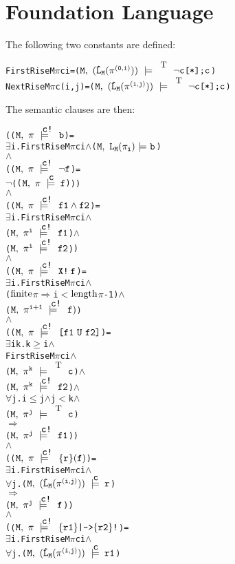 \documentclass{llncs}
\newcommand{\And}{\(\wedge\)}
\newcommand{\Imp}{\(\Rightarrow\)}
\newcommand{\Not}{\(\neg\)}
\newcommand{\Forall}{\(\forall\)}
\newcommand{\Exists}{\(\exists\)}
\newcommand{\IsFinitePath}{\({\rm{finite}}\)}
\newcommand{\PathLength}{\({\rm{length}}\)}
\newcommand{\Leq}{\(\leq\)}
\newcommand{\Geq}{\(\geq\)}
\newcommand{\Le}{\(<\)}
\newcommand{\T}{\texttt{\small\rm{T}}}
\newcommand{\bTrue}{\T}
\renewcommand{\Pi}{\(\pi\)}
\newcommand{\BSem}[3]{(\(\tt#1,~#2~{\models}~#3\))}
\newcommand{\SSem}[4]{(\(\tt{#1,~#2~\models^{\hspace*{-2.3mm}\raisebox{1mm}{\tt#3}}~#4}\))}
\newcommand{\FSem}[4]{(\(\tt{#1,~#2~\models^{\hspace*{-2.3mm}\raisebox{1mm}{\tt#3}}~#4}\))}
\newcommand{\FBool}[1]{#1}
\newcommand{\bNot}[1]{\neg#1}
\newcommand{\fNot}[1]{\neg#1}
\newcommand{\weakClock}[1]{#1}
\newcommand{\strongClock}[1]{#1!}
\newcommand{\restN}[2]{#1^{#2}}
\newcommand{\pathEl}[2]{#1_{#2}}
\newcommand{\pathSeg}[2]{#1^{#2}}
\newcommand{\lHat}[1]{\hat{\texttt{L}}_{#1}}
\newcommand{\lNoHat}[1]{{\texttt{L}}_{#1}}
\newcommand{\sBool}[1]{#1}
\newcommand{\sRepeat}[1]{#1\texttt{[*]}}
\newcommand{\sCat}[2]{#1\texttt{;}#2}
\newcommand{\fAnd}[2]{#1 \wedge #2}
\newcommand{\fNext}[1]{\texttt{X!}\hspace*{0.8mm}#1}
\newcommand{\fUntil}[2]{\texttt{[}#1~\texttt{U}~#2\texttt{]}}
\newcommand{\fSuffixImp}[2]{\{#1\}(#2)}
\newcommand{\fStrongImp}[2]{\{#1\}\texttt{|->}\{#2\}\texttt{!}}
\begin{document}
\section{Foundation Language}

The following two constants are defined:

\begin{alltt}
   FirstRise M {\Pi} c i    = \SSem{M}{(\lHat{M} (\pathSeg{\pi}{(0,i)}))}{\bTrue}{\sCat{\sRepeat{\sBool{\bNot{c}}}}{\sBool{c}}}
   NextRise M {\Pi} c (i,j) = \SSem{M}{(\lHat{M} (\pathSeg{\pi}{(i,j)}))}{\bTrue}{\sCat{\sRepeat{\sBool{\bNot{c}}}}{\sBool{c}}}
\end{alltt}

The semantic clauses are then:

\begin{alltt}
    ({\FSem{M}{{\pi}}{{\strongClock{c}}}{\FBool{b}}} = 
      {\Exists}i. FirstRise M {\Pi} c i {\And} {\BSem{M}{\lNoHat{M}(\pathEl{{\pi}}{i})}{b}}
    {\And}
    ({\FSem{M}{{\pi}}{{\strongClock{c}}}{\fNot{f}}} = 
      {\Not}({\FSem{M}{{\pi}}{{\weakClock{c}}}{f}})) 
    {\And}
    ({\FSem{M}{{\pi}}{{\strongClock{c}}}{\fAnd{f1}{f2}}} = 
      {\Exists}i. FirstRise M {\Pi} c i {\And} 
          {\FSem{M}{\restN{{\pi}}{i}}{{\strongClock{c}}}{f1}}    {\And}
          {\FSem{M}{\restN{{\pi}}{i}}{{\strongClock{c}}}{f2}})
    {\And}
    ({\FSem{M}{{\pi}}{{\strongClock{c}}}{\fNext{f}}} = 
      {\Exists}i. FirstRise M {\Pi} c i            {\And} 
          ({\IsFinitePath} {\Pi} {\Imp} i {\Le} \PathLength {\Pi} - 1) {\And}
          {\FSem{M}{\restN{{\pi}}{i+1}}{{\strongClock{c}}}{f)}}
    {\And}
    ({\FSem{M}{{\pi}}{{\strongClock{c}}}{\fUntil{f1}{f2}}} = 
      {\Exists}i k. k {\Geq} i             {\And}
            FirstRise M {\Pi} c i  {\And}
            {\FSem{M}{\restN{{\pi}}{k}}{\weakClock{\T}}{{\FBool{c}}}}      {\And}  
            {\FSem{M}{\restN{{\pi}}{k}}{{\strongClock{c}}}{f2}}     {\And}
            {\Forall}j. i {\Leq} j {\And} j {\Le} k {\And} 
              {\FSem{M}{\restN{{\pi}}{j}}{\weakClock{\T}}{{\FBool{c}}}} 
              {\Imp}
              {\FSem{M}{\restN{{\pi}}{j}}{{\strongClock{c}}}{f1}})
    {\And}
    ({\FSem{M}{{\pi}}{{\strongClock{c}}}{\fSuffixImp{r}{f}}} = 
      {\Exists}i. FirstRise M {\Pi} c i {\And} 
          {\Forall}j. \SSem{M}{(\lHat{M} (\pathSeg{\pi}{(i,j)}))}{c}{r}
              {\Imp}
              {\FSem{M}{\restN{{\pi}}{j}}{{\strongClock{c}}}{f}})
    {\And}
    ({\FSem{M}{{\pi}}{{\strongClock{c}}}{\fStrongImp{r1}{r2}}} = 
      {\Exists}i. FirstRise M {\Pi} c i {\And} 
          {\Forall}j. \SSem{M}{(\lHat{M} (\pathSeg{\pi}{(i,j)}))}{c}{r1}

\end{alltt}
\end{document}
